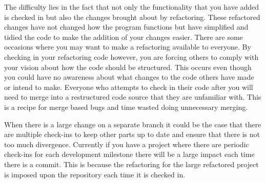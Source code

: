The difficulty lies in the fact that not only the functionality that you have added is checked in but also the changes brought about by refactoring.  These refactored changes have not changed how the program functions but have simplified and tidied the code to make the addition of your changes easier. There are some occasions where you may want to make a refactoring available to everyone.  By checking in your refactoring code however, you are forcing others to comply with your vision about how the code should be structured.  This occurs even though you could have no awareness about what changes to the code others have made or intend to make.  Everyone who attempts to check in their code after you will need to merge into a restructured code source that they are unfamiliar with.  This is a recipe for merge based bugs and time wasted doing unnecessary merging.

% 

% 
% 
% 




When there is a large change on a separate branch it could be the case that there are multiple check-ins to keep other parts up to date and ensure that there is not too much divergence.  Currently if you have a project where there are periodic check-ins for each development milestone there will be a large impact each time there is a commit. This is because the refactoring for the large refactored project is imposed upon the repository each time it is checked in.

